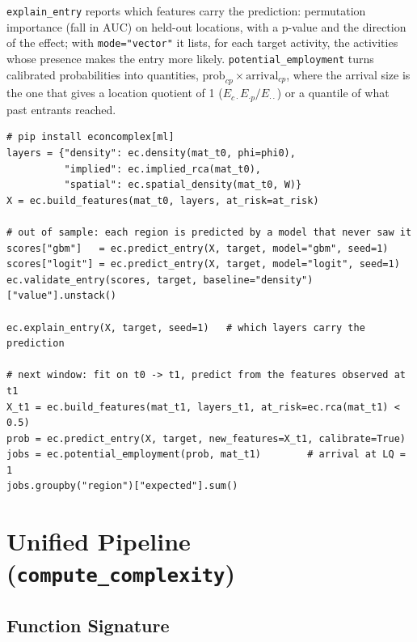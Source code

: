 \documentclass[12pt, a4paper]{article}
\newcommand{\fn}[1]{\texttt{#1}}
\begin{document}
\begin{sloppypar}
\fn{explain\_entry} reports which features carry the prediction:
permutation importance (fall in AUC) on held-out locations, with a
p-value and the direction of the effect; with \texttt{mode="vector"} it
lists, for each target activity, the activities whose presence makes the
entry more likely. \fn{potential\_employment} turns calibrated probabilities into
quantities, $\text{prob}_{cp} \times \text{arrival}_{cp}$, where the
arrival size is the one that gives a location quotient of 1
($E_{c\cdot}E_{\cdot p}/E_{\cdot\cdot}$) or a quantile of what past
entrants reached.
\end{sloppypar}

\begin{lstlisting}[caption={From densities to a prediction model and expected jobs}]
# pip install econcomplex[ml]
layers = {"density": ec.density(mat_t0, phi=phi0),
          "implied": ec.implied_rca(mat_t0),
          "spatial": ec.spatial_density(mat_t0, W)}
X = ec.build_features(mat_t0, layers, at_risk=at_risk)

# out of sample: each region is predicted by a model that never saw it
scores["gbm"]   = ec.predict_entry(X, target, model="gbm", seed=1)
scores["logit"] = ec.predict_entry(X, target, model="logit", seed=1)
ec.validate_entry(scores, target, baseline="density")["value"].unstack()

ec.explain_entry(X, target, seed=1)   # which layers carry the prediction

# next window: fit on t0 -> t1, predict from the features observed at t1
X_t1 = ec.build_features(mat_t1, layers_t1, at_risk=ec.rca(mat_t1) < 0.5)
prob = ec.predict_entry(X, target, new_features=X_t1, calibrate=True)
jobs = ec.potential_employment(prob, mat_t1)        # arrival at LQ = 1
jobs.groupby("region")["expected"].sum()
\end{lstlisting}

\section{Unified Pipeline (\texttt{compute\_complexity})}

\subsection{Function Signature}
\end{document}
